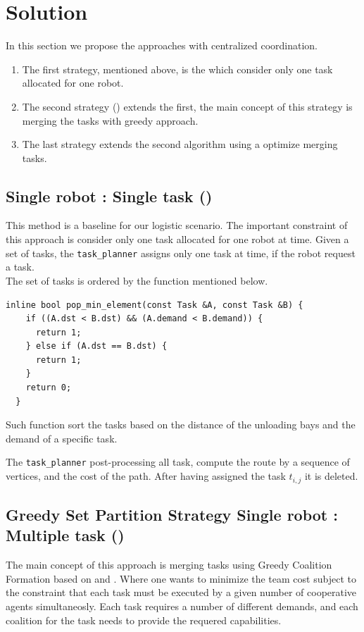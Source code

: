 \section{Solution}

In this section we propose the approaches with centralized coordination.
\begin{enumerate}
\item The first strategy, mentioned above, is the \srst which consider only 
one task allocated for one robot.

\item The second strategy (\gsp) extends the first, the main concept of this strategy 
is merging the tasks with greedy approach. 

\item The last strategy \sps extends the second algorithm using a optimize merging tasks. 
\end{enumerate}

\subsection{Single robot : Single task (\srst)}

This method is a baseline for our logistic scenario.
The important constraint of this approach is consider only one task allocated for 
one robot at time.
Given a set of tasks, the \texttt{task\_planner} assigns only one task at time,
if the robot request a task.
\\
The set of tasks is ordered by the function mentioned below.
\begin{lstlisting}
inline bool pop_min_element(const Task &A, const Task &B) {
    if ((A.dst < B.dst) && (A.demand < B.demand)) {
      return 1;
    } else if (A.dst == B.dst) {
      return 1;
    }
    return 0;
  }
\end{lstlisting}
Such function sort the tasks based on the distance of the unloading bays and the demand of a specific task.

The \texttt{task\_planner} post-processing all task, compute the route by a sequence 
of vertices, and the cost of the path. After having assigned the task $t_{i,j}$ 
it is deleted.

\subsection{Greedy Set Partition Strategy Single robot : Multiple task (\gsp)}

The main concept of this approach is merging tasks using Greedy Coalition Formation
based on \cite{cf_greedy} and \cite{cf_farinelli}. Where one wants to minimize the 
team cost subject to the constraint that each task must be executed by a given 
number of cooperative agents simultaneosly. Each task requires a number of different 
demands, and each coalition for the task needs to provide the requered capabilities.

